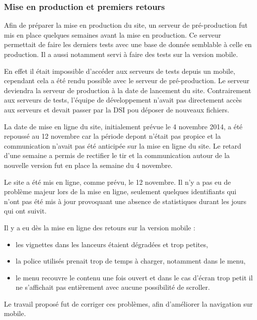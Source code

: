 \documentclass[12pt,a4paper]{article}
\begin{document}
\subsubsection{Mise en production et premiers retours}
Afin de préparer la mise en production du site, un serveur de pré-production fut mis en place quelques semaines avant la mise en production. Ce serveur permettait de faire les derniers tests avec une base de donnée semblable à celle en production. Il a aussi notamment servi à faire des tests sur la version mobile.\par 
En effet il était impossible d'accéder aux serveurs de tests depuis un mobile, cependant cela a été rendu possible avec le serveur de pré-production. Le serveur deviendra la serveur de production à la date de lancement du site. Contrairement aux serveurs de tests, l'équipe de développement n'avait pas directement accès aux serveurs et devait passer par la DSI pou déposer de nouveaux fichiers.\par 
\bigskip
La date de mise en ligne du site, initialement prévue le 4 novembre 2014, a été repoussé au 12 novembre car la période depont n'était pas propice et la communication n'avait pas été anticipée sur la mise en ligne du site. Le retard d'une semaine a permis de rectifier le tir et la communication autour de la nouvelle version fut en place la semaine du 4 novembre.\par
Le site a été mis en ligne, comme prévu, le 12 novembre. Il n'y a pas eu de problème majeur lors de la mise en ligne, seulement quelques identifiants qui n'ont pas été mis à jour provoquant une absence de statistiques durant les jours qui ont suivit.\par 
Il y a eu dès la mise en ligne des retours sur la version mobile :
\begin{itemize}
\item les vignettes dans les lanceurs étaient dégradées et trop petites,
\item la police utilisés prenait trop de temps à charger, notamment dans le menu,
\item le menu recouvre le contenu une fois ouvert et dans le cas d'écran trop petit il ne s'affichait pas entièrement avec aucune possibilité de scroller.
\end{itemize}
Le travail proposé fut de corriger ces problèmes, afin d'améliorer la navigation sur mobile.
\end{document}
